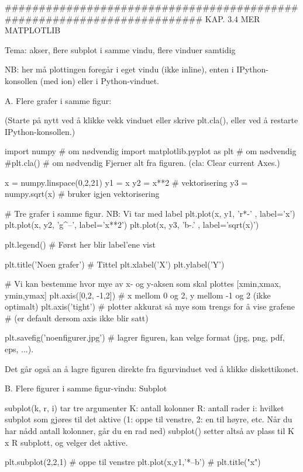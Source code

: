 ######################################################################## 
KAP. 3.4  MER MATPLOTLIB

Tema: akser, flere subplot i samme vindu, flere vinduer samtidig 

NB: her må plottingen foregår i eget vindu (ikke inline), 
enten i IPython-konsollen (med ion) eller i Python-vinduet. 



A. Flere grafer i samme figur: 

(Starte på nytt ved å klikke vekk vinduet eller skrive plt.cla(), eller ved å restarte IPython-konsollen.) 

import numpy                        # om nødvendig
import matplotlib.pyplot as plt     # om nødvendig
#plt.cla()                          # om nødvendig  Fjerner alt fra figuren. (cla: Clear current Axes.) 

x = numpy.linspace(0,2,21)
y1 = x
y2 = x**2                 # vektorisering 
y3 = numpy.sqrt(x)        # bruker igjen vektorisering

# Tre grafer i samme figur. NB: Vi tar med label
plt.plot(x, y1, 'r*-' , label='x')
plt.plot(x, y2, 'g^--', label='x**2')
plt.plot(x, y3, 'b-.' , label='sqrt(x)') 

plt.legend()    # Først her blir label'ene vist 

plt.title('Noen grafer')  # Tittel
plt.xlabel('X') 
plt.ylabel('Y')

# Vi kan bestemme hvor mye av x- og y-aksen som skal plottes [xmin,xmax, ymin,ymax]
plt.axis([0,2, -1,2])     # x mellom 0 og 2, y mellom -1 og 2  (ikke optimalt)
plt.axis('tight')         # plotter akkurat så mye som trengs for å vise grafene 
                          # (er default dersom axis ikke blir satt)
 
plt.savefig('noenfigurer.jpg')  # lagrer figuren, kan velge format (jpg, png, pdf, eps, ...). 

Det går også an å lagre figuren direkte fra figurvinduet ved å klikke diskettikonet. 




B. Flere figurer i samme figur-vindu: Subplot 

subplot(k, r, i) tar tre argumenter 
 K: antall kolonner 
 R: antall rader
 i: hvilket subplot som gjøres til det aktive 
    (1: oppe til venstre, 2: en til høyre, etc. Når du har nådd antall kolonner, går du en rad ned)
subplot() setter altså av plass til K x R subplott, og velger det aktive. 

plt.subplot(2,2,1)          # oppe til venstre 
plt.plot(x,y1,'*--b')       # 
plt.title("x")

